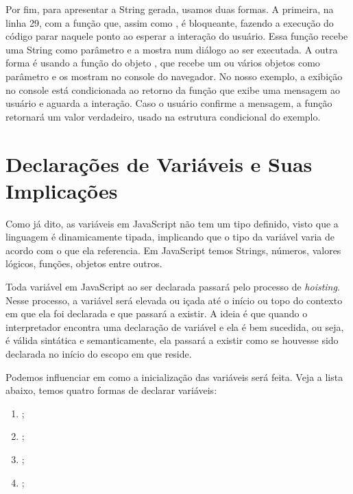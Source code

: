 Por fim, para apresentar a String gerada, usamos duas formas. A primeira, na linha 29, com a função  que, assim como , é bloqueante, fazendo a execução do código parar naquele ponto ao esperar a interação do usuário. Essa função recebe uma String como parâmetro e a mostra num diálogo ao ser executada. A outra forma é usando a função  do objeto , que recebe um ou vários objetos como parâmetro e os mostram no console do navegador. No nosso exemplo, a exibição no console está condicionada ao retorno da função  que exibe uma mensagem ao usuário e aguarda a interação. Caso o usuário confirme a mensagem, a função retornará um valor verdadeiro, usado na estrutura condicional  do exemplo.



\section{Declarações de Variáveis e Suas Implicações}

Como já dito, as variáveis em JavaScript não tem um tipo definido, visto que a linguagem é dinamicamente tipada, implicando que o tipo da variável varia de acordo com o que ela referencia. Em JavaScript temos Strings, números, valores lógicos, funções, objetos entre outros.

Toda variável em JavaScript ao ser declarada passará pelo processo de \textit{hoisting}. Nesse processo, a variável será elevada ou içada até o início ou topo do contexto em que ela foi declarada e que passará a existir. A ideia é que quando o interpretador encontra uma declaração de variável e ela é bem sucedida, ou seja, é válida sintática e semanticamente, ela passará a existir como se houvesse sido declarada no início do escopo em que reside.

Podemos influenciar em como a inicialização das variáveis será feita. Veja a lista abaixo, temos quatro formas de declarar variáveis:

\begin{enumerate}
    \item {};
    \item {};
    \item {};
    \item {};
\end{enumerate}

